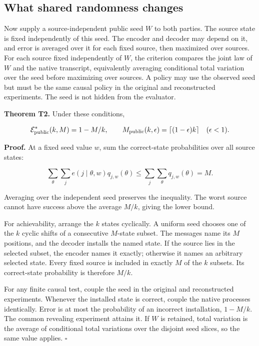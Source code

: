 \documentclass[
  11pt,
  a4paper,
]{article}
\begin{document}
\subsection{What shared randomness
changes}\label{what-shared-randomness-changes}

Now supply a source-independent public seed \(W\) to both parties. The
source state is fixed independently of this seed. The encoder and
decoder may depend on it, and error is averaged over it for each fixed
source, then maximized over sources. For each source fixed independently
of \(W\), the criterion compares the joint law of \(W\) and the native
transcript, equivalently averaging conditional total variation over the
seed before maximizing over sources. A policy may use the observed seed
but must be the same causal policy in the original and reconstructed
experiments. The seed is not hidden from the evaluator.

\textbf{Theorem T2.} Under these conditions,

\[\mathcal E^*_{\rm public}(k,M)=1-M/k,\qquad
M_{\rm public}(k,\epsilon)=\lceil(1-\epsilon)k\rceil\quad(\epsilon<1).\]

\textbf{Proof.} At a fixed seed value \(w\), sum the correct-state
probabilities over all source states:

\[
\sum_\theta\sum_j e(j\mid\theta,w)q_{j,w}(\theta)
\le\sum_j\sum_\theta q_{j,w}(\theta)=M.
\]

Averaging over the independent seed preserves the inequality. The worst
source cannot have success above the average \(M/k\), giving the lower
bound.

For achievability, arrange the \(k\) states cyclically. A uniform seed
chooses one of the \(k\) cyclic shifts of a consecutive \(M\)-state
subset. The messages name its \(M\) positions, and the decoder installs
the named state. If the source lies in the selected subset, the encoder
names it exactly; otherwise it names an arbitrary selected state. Every
fixed source is included in exactly \(M\) of the \(k\) subsets. Its
correct-state probability is therefore \(M/k\).

For any finite causal test, couple the seed in the original and
reconstructed experiments. Whenever the installed state is correct,
couple the native processes identically. Error is at most the
probability of an incorrect installation, \(1-M/k\). The common
revealing experiment attains it. If \(W\) is retained, total variation
is the average of conditional total variations over the disjoint seed
slices, so the same value applies. \(\square\)
\end{document}
